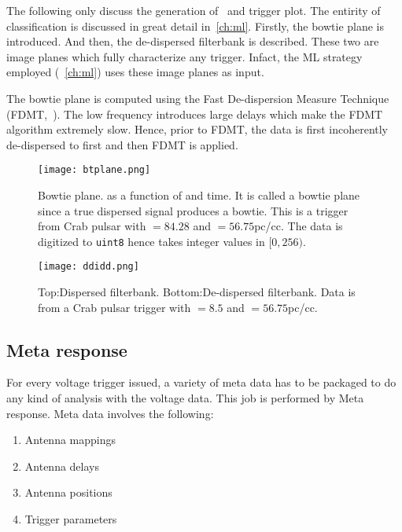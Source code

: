 \par The following only discuss the generation of \dbson~and trigger plot. 
The entirity of classification is discussed in great detail in~\autoref{ch:ml}.
Firstly, the bowtie plane is introduced. And then, the de-dispersed filterbank is described. These two are image planes which fully characterize any trigger. 
Infact, the ML strategy employed (~\autoref{ch:ml}) uses these image planes as input.

\par The bowtie plane is computed using the Fast De-dispersion Measure Technique (FDMT,~\cite{fdmt}).
The low frequency introduces large delays which make the FDMT algorithm extremely slow. 
Hence, prior to FDMT, the data is first incoherently de-dispersed to first \dm and then FDMT is applied.

\begin{figure}
	\label{fig:bt}
	\centering
	\texttt{[image: btplane.png]}
	\caption{Bowtie plane. \sn as a function of \dm and time. 
	It is called a bowtie plane since a true dispersed signal produces a bowtie.
	This is a trigger from Crab pulsar with \sn$=84.28$ and \dm$=56.75$pc/cc.
	The data is digitized to \texttt{uint8} hence takes integer values in $[0,256)$.
}
\end{figure}

\begin{figure}
	\label{fig:dd}
	\centering
	\texttt{[image: ddidd.png]}
	\caption{Top:Dispersed filterbank. Bottom:De-dispersed filterbank.
		Data is from a Crab pulsar trigger with \sn$=8.5$ and \dm$=56.75$pc/cc.
	}
\end{figure}

\subsection {Meta response}
\par For every voltage trigger issued, a variety of meta data has to be packaged to do any kind of analysis with the voltage data. 
This job is performed by Meta response. Meta data involves the following:
\begin{enumerate}
\item Antenna mappings
\item Antenna delays
\item Antenna positions
\item Trigger parameters
\end{enumerate}

